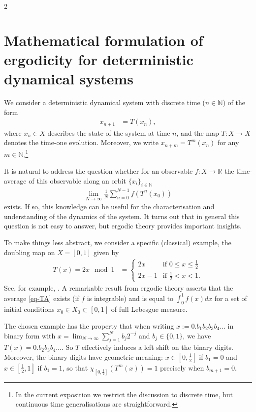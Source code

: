 \documentclass[11pt]{article}
\begin{document}
\begin{multicols}{2}
\section{Mathematical formulation of ergodicity for deterministic dynamical systems}
\label{sec-deterministic-DS}

We consider a deterministic dynamical system with discrete time ($n\in\mathbb{N}$) of the form
\begin{align}\label{eq-DS}
x_{n+1} &= T(x_n),
\end{align}
where $x_n\in X$ describes the state of the system at time $n$, and the map $T:X\to X$ denotes the time-one evolution. Moreover, we write $x_{n+m}=T^m(x_n)$ for any $m\in\mathbb{N}$.\footnote{In the current exposition we restrict the discussion to discrete time, but continuous time generalisations are straightforward.}

It is natural to address the question whether for an observable $f:X\to \mathbb{R}$ the time-average of this observable along an orbit $\{x_i\}_{i\in\mathbb{N}}$ 
\begin{align}
\label{eq-TA}
\lim_{N \to \infty} \frac{1}{N} \sum_{n=0}^{N-1} f(T^n(x_0))
\end{align}
exists. If so, this knowledge can be useful for the characterisation and understanding of the dynamics of the system.
It turns out that in general this question is not easy to answer, but ergodic theory provides important insights.

To make things less abstract, we consider a specific (classical) example, the doubling map on $X=[0,1]$ given by 
\begin{align}
\label{eq-doubling}
T(x) =2 x\mod 1 &= 
\left\{
\begin{array}{ll}
   2 x  &  \text{if $0 \leq x \leq \frac{1}{2}$}\\
    2x -1  &  \text{if $\frac{1}{2} < x< 1 $.}
\end{array}
\right. 
\end{align}
See, for example, \cite[chap3]{silva2008invitation}.
A remarkable result from ergodic theory asserts that the average \eqref{eq-TA} 
exists (if $f$ is integrable) and is equal to $\int_0^1f(x)dx$ for a set of initial conditions $x_0\in X_0\subset [0,1]$ of full Lebesgue measure.

The chosen example has the property that when writing $x:=0.b_1b_2b_3b_4\ldots$ in binary form with $x=\lim_{N\to\infty}\sum_{j=1}^{N} b_j 2^{-j}$ and $b_j\in\{0,1\}$, we have $T(x)=0.b_2b_3b_4\ldots$. So $T$ effectively induces a left shift on the binary digits. Moreover, the binary digits have geometric meaning: $x\in [0,\frac{1}{2}]$ if $b_1=0$ and $x\in [\frac{1}{2},1]$ if $b_1=1$, so that $\chi_{[0,\frac{1}{2}]}(T^m(x))=1$ precisely when $b_{m+1}=0$.


\end{multicols}
\end{document}
